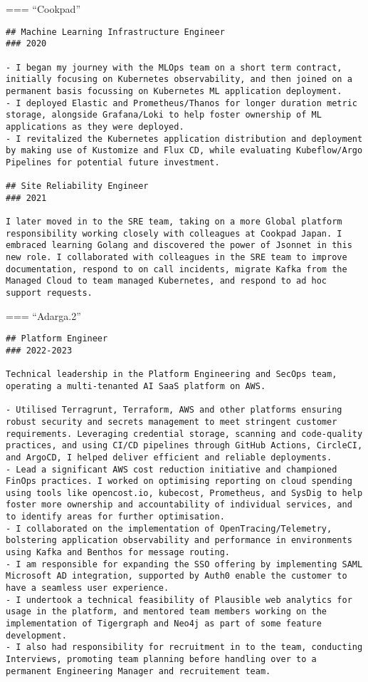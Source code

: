 \documentclass[
]{article}
\begin{document}
=== ``Cookpad''

\begin{verbatim}
## Machine Learning Infrastructure Engineer
### 2020

- I began my journey with the MLOps team on a short term contract, initially focusing on Kubernetes observability, and then joined on a permanent basis focussing on Kubernetes ML application deployment.
- I deployed Elastic and Prometheus/Thanos for longer duration metric storage, alongside Grafana/Loki to help foster ownership of ML applications as they were deployed.
- I revitalized the Kubernetes application distribution and deployment by making use of Kustomize and Flux CD, while evaluating Kubeflow/Argo Pipelines for potential future investment.

## Site Reliability Engineer
### 2021

I later moved in to the SRE team, taking on a more Global platform responsibility working closely with colleagues at Cookpad Japan. I embraced learning Golang and discovered the power of Jsonnet in this new role. I collaborated with colleagues in the SRE team to improve documentation, respond to on call incidents, migrate Kafka from the Managed Cloud to team managed Kubernetes, and respond to ad hoc support requests.
\end{verbatim}

=== ``Adarga.2''

\begin{verbatim}
## Platform Engineer
### 2022-2023

Technical leadership in the Platform Engineering and SecOps team, operating a multi-tenanted AI SaaS platform on AWS.

- Utilised Terragrunt, Terraform, AWS and other platforms ensuring robust security and secrets management to meet stringent customer requirements. Leveraging credential storage, scanning and code-quality practices, and using CI/CD pipelines through GitHub Actions, CircleCI, and ArgoCD, I helped deliver efficient and reliable deployments.
- Lead a significant AWS cost reduction initiative and championed FinOps practices. I worked on optimising reporting on cloud spending using tools like opencost.io, kubecost, Prometheus, and SysDig to help foster more ownership and accountability of individual services, and to identify areas for further optimisation.
- I collaborated on the implementation of OpenTracing/Telemetry, bolstering application observability and performance in environments using Kafka and Benthos for message routing.
- I am responsible for expanding the SSO offering by implementing SAML Microsoft AD integration, supported by Auth0 enable the customer to have a seamless user experience.
- I undertook a technical feasibility of Plausible web analytics for usage in the platform, and mentored team members working on the implementation of Tigergraph and Neo4j as part of some feature development.
- I also had responsibility for recruitment in to the team, conducting Interviews, promoting team planning before handling over to a permanent Engineering Manager and recruitement team.
\end{verbatim}
\end{document}
